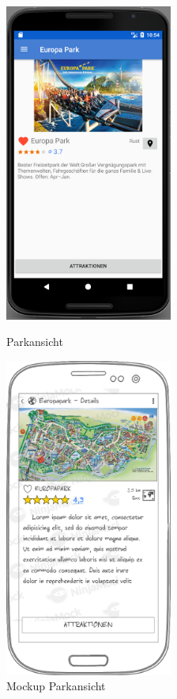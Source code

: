 \begin{figure}[h]
    \centering
    \begin{minipage}{0.49\textwidth}
        \centering
        \includegraphics[width=0.49\textwidth, trim=150 200 200 200, 
        clip]{img/screenshots/ss_parkdetail.png}
        \caption{Parkansicht}
		\label{figure:implementierungparkansicht}
    \end{minipage}
    \begin{minipage}{0.49\textwidth}
        \centering
        \includegraphics[width=0.49\textwidth]{img/mockups/m_park_detail.png}
        \caption{Mockup Parkansicht}
    \end{minipage}
\end{figure}

